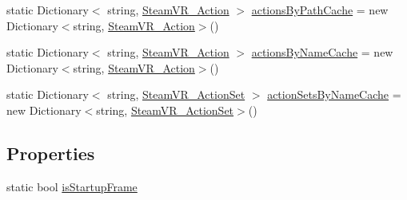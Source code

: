\begin{DoxyCompactItemize}
\item 
static Dictionary$<$ string, \mbox{\hyperlink{class_valve_1_1_v_r_1_1_steam_v_r___action}{Steam\+V\+R\+\_\+\+Action}} $>$ \mbox{\hyperlink{class_valve_1_1_v_r_1_1_steam_v_r___input_aa5d9bed4bfa6fa55db30255a164f449f}{actions\+By\+Path\+Cache}} = new Dictionary$<$string, \mbox{\hyperlink{class_valve_1_1_v_r_1_1_steam_v_r___action}{Steam\+V\+R\+\_\+\+Action}}$>$()
\item 
static Dictionary$<$ string, \mbox{\hyperlink{class_valve_1_1_v_r_1_1_steam_v_r___action}{Steam\+V\+R\+\_\+\+Action}} $>$ \mbox{\hyperlink{class_valve_1_1_v_r_1_1_steam_v_r___input_a9e6c74166dfeb1c00d27af76c6af26b0}{actions\+By\+Name\+Cache}} = new Dictionary$<$string, \mbox{\hyperlink{class_valve_1_1_v_r_1_1_steam_v_r___action}{Steam\+V\+R\+\_\+\+Action}}$>$()
\item 
static Dictionary$<$ string, \mbox{\hyperlink{class_valve_1_1_v_r_1_1_steam_v_r___action_set}{Steam\+V\+R\+\_\+\+Action\+Set}} $>$ \mbox{\hyperlink{class_valve_1_1_v_r_1_1_steam_v_r___input_a529087e098ae53b525c0e6628803f6b5}{action\+Sets\+By\+Name\+Cache}} = new Dictionary$<$string, \mbox{\hyperlink{class_valve_1_1_v_r_1_1_steam_v_r___action_set}{Steam\+V\+R\+\_\+\+Action\+Set}}$>$()
\end{DoxyCompactItemize}
\subsection*{Properties}
\begin{DoxyCompactItemize}
\item 
static bool \mbox{\hyperlink{class_valve_1_1_v_r_1_1_steam_v_r___input_aa029ce204a4aa36e6a3bd6ba3ee14bb3}{is\+Startup\+Frame}}
\end{DoxyCompactItemize}
